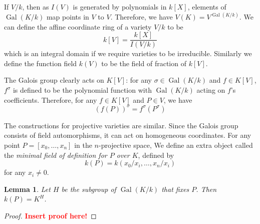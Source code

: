 \documentclass[12pt]{article}
\newtheorem{lemma}{Lemma}[subsection]
\theoremstyle{remark}
\newcommand{\s}[0]{\sigma}
\newcommand{\Gal}[0]{\operatorname{Gal}}
\begin{document}
        If $V/k$, then as $I(V)$ is generated by polynomials in $k[X]$, elements of $\Gal(K/k)$ map points in $V$ to $V$. Therefore, we have $V(K)=V^{\Gal(K/k)}$. We can define the affine coordinate ring of a variety $V/k$ to be
        \[k[V]=\frac{k[X]}{I(V/k)}\]
        which is an integral domain if we require varieties to be irreducible. Similarly we define the function field $k(V)$ to be the field of fraction of $k[V]$.

        The Galois group clearly acts on $K[V]$: for any $\sigma\in\Gal(K/k)$ and $f\in K[V]$, $f^{\s}$ is defined to be the polynomial function with $\Gal(K/k)$ acting on $f$'s coefficients. Therefore, for any $f\in K[V]$ and $P\in V$, we have
        \[\left(f(P)\right)^\s=f^\s\left(P^\s\right)\]
    
        The constructions for projective varieties are similar. Since the Galois group consists of field automorphisms, it can act on homogeneous coordinates. For any point $P=[x_0,\dots,x_n]$ in the $n$-projective space, We define an extra object called the \textit{minimal field of definition for $P$ over $K$}, defined by
        \[k(P)=k(x_0/x_i,\dots, x_n/x_i)\]
        for any $x_i\neq 0$.
        \begin{lemma}
            Let $H$ be the subgroup of $\Gal(K/k)$ that fixes $P$. Then $k(P)=K^H$.
        \end{lemma}
        \begin{proof}
            \textcolor{red}{\textbf{Insert proof here!}}
        \end{proof}
        
\end{document}
